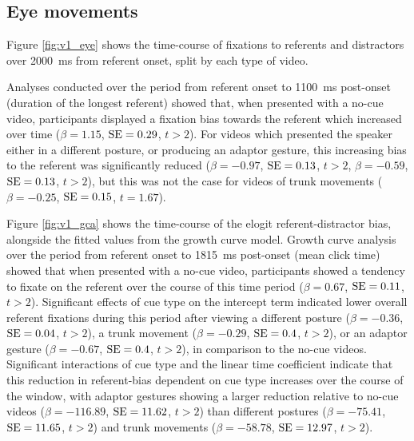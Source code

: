 \documentclass[a4paper,man,natbib]{apa6}
\newcommand{\resultsLM}[3]{$\beta = #1$, $\textnormal{SE} = #2$, $t #3$}
\begin{document}
\subsection{Eye movements}
Figure \ref{fig:v1_eye} shows the time-course of fixations to referents and distractors over 2000~ms from referent onset, split by each type of video.

Analyses conducted over the period from referent onset to 1100~ms post-onset (duration of the longest referent) showed that, when presented with a no-cue video, participants displayed a fixation bias towards the referent which increased over time (\resultsLM{1.15}{0.29}{>2}). %
For videos which presented the speaker either in a different posture, or producing an adaptor gesture, this increasing bias to the referent was significantly reduced
(\resultsLM{-0.97}{0.13}{>2}, \resultsLM{-0.59}{0.13}{>2}), but this was not the case for videos of trunk movements (\resultsLM{-0.25}{0.15}{=1.67}). 

Figure \ref{fig:v1_gca} shows the time-course of the elogit referent-distractor bias, alongside the fitted values from the growth curve model. 
Growth curve analysis over the period from referent onset to 1815~ms post-onset (mean click time) showed that when presented with a no-cue video, participants showed a tendency to fixate on the referent over the course of this time period (\resultsLM{0.67}{0.11}{>2}). 
Significant effects of cue type on the intercept term indicated lower overall referent fixations during this period after viewing a different posture (\resultsLM{-0.36}{0.04}{>2}), a trunk movement (\resultsLM{-0.29}{0.4}{>2}), or an adaptor gesture (\resultsLM{-0.67}{0.4}{>2}), in comparison to the no-cue videos.
Significant interactions of cue type and the linear time coefficient indicate that this reduction in referent-bias dependent on cue type increases over the course of the window, with adaptor gestures showing a larger reduction relative to no-cue videos (\resultsLM{-116.89}{11.62}{>2}) than different postures (\resultsLM{-75.41}{11.65}{>2}) and trunk movements (\resultsLM{-58.78}{12.97}{>2}). 
\end{document}
